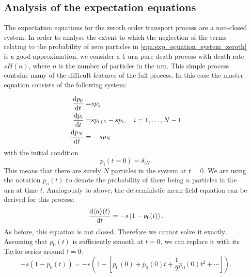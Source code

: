 \FloatBarrier
\subsection{Analysis of the expectation equations}
The expectation equations for the zeroth order transport process are a
non-closed system. In order to analyse the extent to which the neglection of the
terms relating to the probability of zero particles in
\eqref{eqn:exp_equation_system_zeroth} is a good approximation, we consider a
1-urn pure-death process with death rate \(s H(n)\), where \(n\) is the number
of particles in the urn. This simple process contains many of the difficult
features of the full process. In this case the master equation consists of the
following system:

\begin{align*}
    \frac{\mathrm{d} p_0}{\mathrm{d} t} =& s p_1\\
    \frac{\mathrm{d} p_i}{\mathrm{d} t} =& s p_{i+1} - s p_i, \quad i = 1,\dotsc,N-1\\
    \frac{\mathrm{d} p_N}{\mathrm{d} t} =& - s p_N
\end{align*}
with the initial condition
\begin{equation}
    \label{eqn:pure_death_ic}
    p_i(t=0) = \delta_{iN}.
\end{equation}
This means that there are surely \(N\) particles in the system at \(t=0\). We
are using the notation \(p_n(t)\) to denote the probability of there being \(n\)
particles in the urn at time \(t\).  Analogously to above, the deterministic
mean-field equation can be derived for this process:
\begin{equation*}
    \frac{\mathrm{d} \langle n \rangle(t)}{\mathrm{d} t} = -s \left(1-p_0(t)\right).
\end{equation*}
As before, this equation is not closed. Therefore we cannot solve it exactly.
Assuming that \(p_0(t)\) is sufficiently smooth at \(t=0\), we can replace it
with its Taylor series around \(t=0\):
\begin{equation*}
    -s(1-p_0(t)) = -s\left(1 - \left[p_0(0) + \dot{p_0}(0)t +
    \frac{1}{2}\ddot{p_0}(0)t^2 + \dotsb \right] \right).
\end{equation*}

